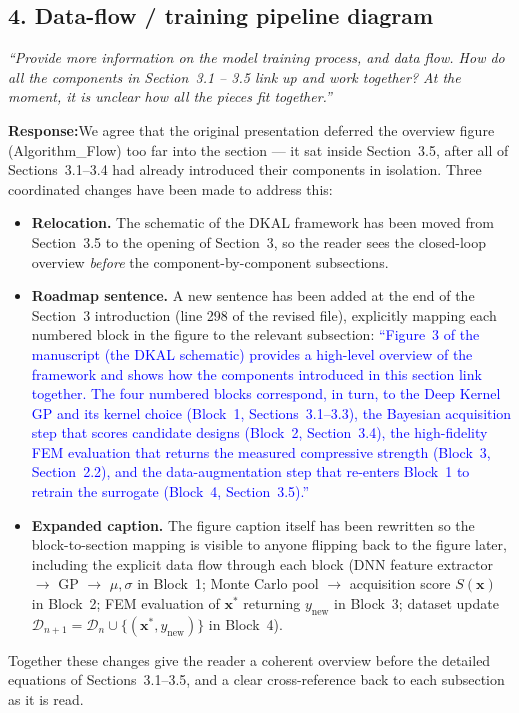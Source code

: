 \documentclass[11pt,a4paper]{article}
\newcommand{\new}[1]{\textcolor{blue}{#1}}
\newcommand{\rev}[1]{\par\noindent\textit{\small #1}\par\smallskip}
\newcommand{\resp}{\par\noindent\textbf{Response:}\space}
\begin{document}
\subsection*{4. Data-flow / training pipeline diagram}
\rev{``Provide more information on the model training process, and data flow. How do all the components in Section~3.1 -- 3.5 link up and work together? At the moment, it is unclear how all the pieces fit together.''}
\resp We agree that the original presentation deferred the overview figure (Algorithm\_Flow) too far into the section --- it sat inside Section~3.5, after all of Sections~3.1--3.4 had already introduced their components in isolation. Three coordinated changes have been made to address this:
\begin{itemize}
    \item \textbf{Relocation.} The schematic of the DKAL framework has been moved from Section~3.5 to the opening of Section~3, so the reader sees the closed-loop overview \emph{before} the component-by-component subsections.
    \item \textbf{Roadmap sentence.} A new sentence has been added at the end of the Section~3 introduction (line 298 of the revised file), explicitly mapping each numbered block in the figure to the relevant subsection: \new{``Figure~3 of the manuscript (the DKAL schematic) provides a high-level overview of the framework and shows how the components introduced in this section link together. The four numbered blocks correspond, in turn, to the Deep Kernel GP and its kernel choice (Block~1, Sections~3.1--3.3), the Bayesian acquisition step that scores candidate designs (Block~2, Section~3.4), the high-fidelity FEM evaluation that returns the measured compressive strength (Block~3, Section~2.2), and the data-augmentation step that re-enters Block~1 to retrain the surrogate (Block~4, Section~3.5).''}
    \item \textbf{Expanded caption.} The figure caption itself has been rewritten so the block-to-section mapping is visible to anyone flipping back to the figure later, including the explicit data flow through each block (DNN feature extractor $\rightarrow$ GP $\rightarrow$ $\mu, \sigma$ in Block~1; Monte Carlo pool $\rightarrow$ acquisition score $S(\mathbf{x})$ in Block~2; FEM evaluation of $\mathbf{x}^*$ returning $y_{\text{new}}$ in Block~3; dataset update $\mathcal{D}_{n+1} = \mathcal{D}_n \cup \{(\mathbf{x}^*, y_{\text{new}})\}$ in Block~4).
\end{itemize}
Together these changes give the reader a coherent overview before the detailed equations of Sections~3.1--3.5, and a clear cross-reference back to each subsection as it is read.
\end{document}
